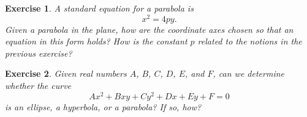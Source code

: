 \documentclass[12pt]{article}
\theoremstyle{plain}
\newtheorem{ex}{Exercise}
\begin{document}
\begin{ex}
  A standard equation for a parabola is
  \[
    x^2=4py.
  \]
  Given a parabola in the plane, how are the coordinate axes chosen so that an equation in this form holds? How is the constant $p$ related to the notions in the previous exercise?
\end{ex}

\begin{ex}
  Given real numbers $A$, $B$, $C$, $D$, $E$, and $F$, can we determine whether the curve
  \[
    Ax^2+Bxy+Cy^2+Dx+Ey+F=0
  \]
  is an ellipse, a hyperbola, or a parabola? If so, how?
\end{ex}
\end{document}
